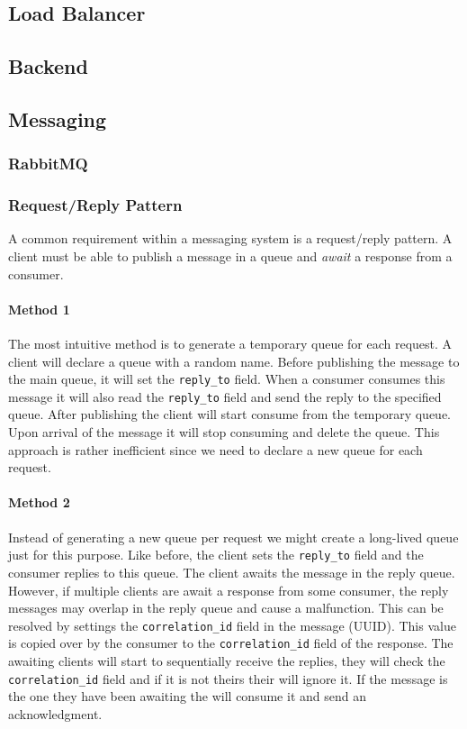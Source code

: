 \documentclass[../documentation.tex]{subfiles}
\begin{document}
\subsection{Load Balancer}

\subsection{Backend}

\subsection{Messaging}

\subsubsection{RabbitMQ}


\pagebreak

\subsubsection{Request/Reply Pattern}

A common requirement within a messaging system is a request/reply pattern.
A client must be able to publish a message in a queue and \textit{await}
a response from a consumer.

\paragraph{Method 1} The most intuitive method is to generate a temporary queue for each request.
A client will declare a queue with a random name. Before publishing the message to the main queue,
it will set the \texttt{reply\_to} field. When a consumer consumes this message it will also read the
\texttt{reply\_to} field and send the reply to the specified queue. After publishing the client will start consume
from the temporary queue. Upon arrival of the message it will stop consuming and delete the queue.
This approach is rather inefficient since we need to declare a new queue for each request.

\paragraph{Method 2} Instead of generating a new queue per request we might create a long-lived queue
just for this purpose. Like before, the client sets the \texttt{reply\_to} field and the consumer replies
to this queue. The client awaits the message in the reply queue. However, if multiple clients
are await a response from some consumer, the reply messages may overlap in the reply queue and cause a malfunction.
This can be resolved by settings the \texttt{correlation\_id} field in the message (UUID). This value is copied
over by the consumer to the \texttt{correlation\_id} field of the response. The awaiting clients will start to
sequentially receive the replies, they will check the \texttt{correlation\_id} field and if it is not theirs
their will ignore it. If the message is the one they have been awaiting the will consume it and send an acknowledgment.
\end{document}
